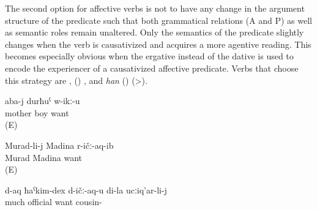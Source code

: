 The second option for affective verbs is not to have any change in the argument structure of the predicate such that both grammatical relations (A and P) as well as semantic roles remain unaltered. Only the semantics of the predicate slightly changes when the verb is causativized  and acquires a more agentive reading. This becomes especially obvious when the ergative instead of the dative is used to encode the experiencer of a causativized affective predicate. Verbs that choose this strategy are  ,  () , and \textit{han}  ()  (>).
%
\begin{exe}
	\ex	\label{ex:Mother, son; Murad, Madina@60}
	\begin{xlist}
		\ex	\label{ex:Mother likes/wants her son@60a}
		\gll	aba-j	durħuˁ	w-ikː-u\\
			mother	boy	want\\
		\glt	{} (E)

		\ex	\label{ex:Murad loved Madina@60b}
		\gll	Murad-li-j	Madina	r-ičː-aq-ib\\
			Murad	Madina	want\\
		\glt	{} (E)
	\end{xlist}

	\ex	\label{ex:My cousin loves official appointments very much}
	\gll	d-aq	ħaˁkim-dex	d-ičː-aq-u	di-la	ucːiq'ar-li-j\\
		much	official	want		cousin-\\
	\glt	{}
\end{exe}

